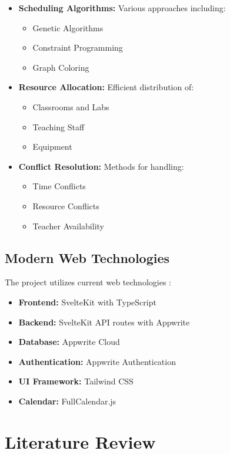 \documentclass[12pt,a4paper]{report}
\begin{document}
\begin{itemize}
    \item \textbf{Scheduling Algorithms:} Various approaches including:
        \begin{itemize}
            \item Genetic Algorithms
            \item Constraint Programming
            \item Graph Coloring
        \end{itemize}
    \item \textbf{Resource Allocation:} Efficient distribution of:
        \begin{itemize}
            \item Classrooms and Labs
            \item Teaching Staff
            \item Equipment
        \end{itemize}
    \item \textbf{Conflict Resolution:} Methods for handling:
        \begin{itemize}
            \item Time Conflicts
            \item Resource Conflicts
            \item Teacher Availability \cite{resource_allocation}
        \end{itemize}
\end{itemize}

\subsection{Modern Web Technologies}
The project utilizes current web technologies \cite{web_development}:

\begin{itemize}
    \item \textbf{Frontend:} SvelteKit with TypeScript
    \item \textbf{Backend:} SvelteKit API routes with Appwrite
    \item \textbf{Database:} Appwrite Cloud
    \item \textbf{Authentication:} Appwrite Authentication
    \item \textbf{UI Framework:} Tailwind CSS
    \item \textbf{Calendar:} FullCalendar.js
\end{itemize}

\section{Literature Review}
\end{document}
